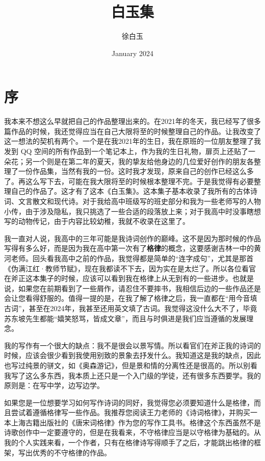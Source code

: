 \documentclass[a5paper]{ctexart}
\title{白玉集}
\author{徐白玉}
\date{January 2024}
\begin{document}
	\maketitle
	\thispagestyle{empty}
	\newpage
	\setcounter{page}{1}
	\tableofcontents
	
	\newpage
	\setcounter{page}{1}
	\section{序}
	我本来不想这么早就把自己的作品整理出来的。在2021年的冬天，我已经写了很多篇作品的时候，我还觉得应当在自己大限将至的时候整理自己的作品。让我改变了这一想法的契机有两个。一个是在我2021年的生日，我在原班的一位朋友整理了我发到 QQ 空间的所有作品到一个笔记本上，作为我的生日礼物，扉页上还贴了一朵花；另一个则是在第二年的夏天，我的挚友给他身边的几位爱好创作的朋友各整理了一份作品集，当然有我的一份。这时我才发现，原来自己的创作已经这么多了。再这么写下去，可能在我大限将至的时候根本整理不完。于是我觉得有必要整理自己的作品了。这才有了这本《白玉集》。这本集子基本收录了我所有的古体诗词、文言散文和现代诗。对于我给高中班级写的班史部分和我为一些老师写的人物小传，由于涉及隐私，我只挑选了一些合适的段落放上来；对于我高中时没事瞎想写的动物传记，由于内容比较幼稚，我就不收录在这里了。
	
	我一直对人说，我高中的三年可能是我诗词创作的巅峰。这不是因为那时候的作品写得有多么好，而是因为我在高中第一次有了\textbf{格律}的概念，这要感谢吉林一中的黄河老师。回头看我高中之前的作品，我觉得都是简单的“连字成句”，尤其是那首《伪满江红·教师节赋》，现在我都读不下去，因为实在是太烂了。所以各位看官在斧正这本集子的时候，应该可以看到我在格律上从无到有的一些进步。也就是说，如果您在前期看到了一些屑作，请忍住不要摔书，我相信后边的一些作品还是会让您看得舒服的。值得一提的是，在我了解了格律之后，我一直都在“用今音填古词”，甚至在2024年，我甚至还用英文填了古词。我觉得这没什么大不了，毕竟苏东坡先生都能“嬉笑怒骂，皆成文章”，而且与时俱进是我们应当遵循的发展理念。
	
	我的写作有一个很大的缺点：我不是很会以景写情。所以看官们在斧正我的诗词的时候，应该会很少看到我使用别致的景象去抒发什么。我知道这是我的缺点，因此也写过纯景的骈文，如《奥森游记》，但是景和情的分离性还是很高的。所以别看我写了这么多东西，我本质上还只是一个入门级的学徒，还有很多东西要学。我的原则是：在写中学，边写边学。
	
	如果您是一位想要学习如何写作诗词的同好，我觉得您必须要知道什么是格律，而且尝试着遵循格律写一些作品。我推荐您阅读王力老师的《诗词格律》，并购买一本上海古籍出版社的《唐宋词格律》作为您的写作工具书。格律这个东西虽然不是诗歌创作中一定要遵守的，但是在我看来，不守格律应当是以守格律为基础的。从我的个人实践来看，一个作者，只有在格律诗写得顺手了之后，才能跳出格律的框架，写出优秀的不守格律的作品。
	
\end{document}
